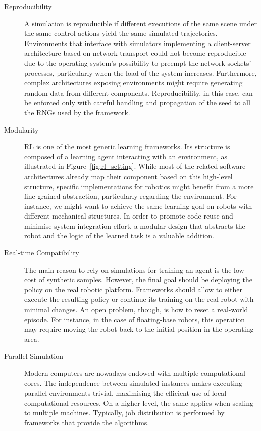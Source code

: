 \begin{addmargin}{-2mm}
\begin{description}
%
\item[Reproducibility]
%
A simulation is reproducible if different executions of the same scene under the same control actions yield the same simulated trajectories.
Environments that interface with simulators implementing a client-server architecture based on network transport could not become reproducible due to the operating system's possibility to preempt the network sockets' processes, particularly when the load of the system increases.
Furthermore, complex architectures exposing environments might require generating random data from different components.
Reproducibility, in this case, can be enforced only with careful handling and propagation of the seed to all the \acp{RNG} used by the framework.
%
\item[Modularity]
%
\acl{RL} is one of the most generic learning frameworks.
Its structure is composed of a learning agent interacting with an environment, as illustrated in Figure~\ref{fig:rl_setting}.
While most of the related software architectures already map their component based on this high-level structure, specific implementations for robotics might benefit from a more fine-grained abstraction, particularly regarding the environment.
For instance, we might want to achieve the same learning goal on robots with different mechanical structures.
In order to promote code reuse and minimise system integration effort, a modular design that abstracts the robot and the logic of the learned task is a valuable addition.
%
\item[Real-time Compatibility]
%
The main reason to rely on simulations for training an agent is the low cost of synthetic samples.
However, the final goal should be deploying the policy on the real robotic platform.
Frameworks should allow to either execute the resulting policy or continue its training on the real robot with minimal changes.
An open problem, though, is how to reset a real-world episode.
For instance, in the case of floating-base robots, this operation may require moving the robot back to the initial position in the operating area.
%
\item[Parallel Simulation]
%
Modern computers are nowadays endowed with multiple computational cores.
The independence between simulated instances makes executing parallel environments trivial,
maximising the efficient use of local computational resources.
On a higher level, the same applies when scaling to multiple machines.
Typically, job distribution is performed by frameworks that provide the algorithms.

\end{description}
\end{addmargin}
